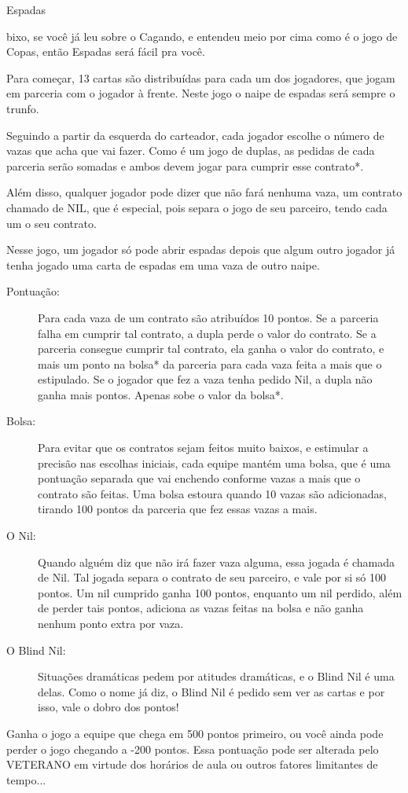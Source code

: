 \begin{subsecao}{Espadas} 

bixo, se você já leu sobre o Cagando, e entendeu meio por cima como é o jogo de
Copas, então Espadas será fácil pra você. 

Para começar, 13 cartas são distribuídas para cada um dos jogadores, que jogam
em parceria com o jogador à frente. Neste jogo o naipe de espadas será sempre o
trunfo.

Seguindo a partir da esquerda do carteador, cada jogador escolhe o número de
vazas que acha que vai fazer. Como é um jogo de duplas, as pedidas de cada
parceria serão somadas e ambos devem jogar para cumprir esse contrato*. 

Além disso, qualquer jogador pode dizer que não fará nenhuma vaza, um contrato
chamado de NIL, que é especial, pois separa o jogo de seu parceiro, tendo cada
um o seu contrato.

Nesse jogo, um jogador só pode abrir espadas depois que algum outro jogador já
tenha jogado uma carta de espadas em uma vaza de outro naipe.
\begin{description}

\item[Pontuação:]

Para cada vaza de um contrato são atribuídos 10 pontos. Se a parceria falha em
cumprir tal contrato, a dupla perde o valor do contrato. Se a parceria consegue
cumprir tal contrato, ela ganha o valor do contrato, e mais um ponto
na bolsa* da parceria para cada vaza feita a mais que o estipulado.
Se o jogador que fez a vaza tenha pedido Nil, a dupla não ganha mais pontos.
Apenas sobe o valor da bolsa*.

\item[Bolsa:]

Para evitar que os contratos sejam feitos muito baixos, e estimular a precisão
nas escolhas iniciais, cada equipe mantém uma bolsa, que é uma pontuação
separada que vai enchendo conforme vazas a mais que o contrato são feitas. Uma
bolsa estoura quando 10 vazas são adicionadas, tirando 100 pontos da parceria
que fez essas vazas a mais.

\item[O Nil:]
Quando alguém diz que não irá fazer vaza alguma, essa jogada é chamada de Nil.
Tal jogada separa o contrato de seu parceiro, e vale por si só 100 pontos. Um
nil cumprido ganha 100 pontos, enquanto um nil perdido, além de perder tais
pontos, adiciona as vazas feitas na bolsa e não ganha nenhum ponto extra por
vaza.

\item[O Blind Nil:]
Situações dramáticas pedem por atitudes dramáticas, e o Blind Nil é uma delas.
Como o nome já diz, o Blind Nil é pedido sem ver as cartas e por isso, vale o
dobro dos pontos!

\end{description}
Ganha o jogo a equipe que chega em 500 pontos primeiro, ou você ainda pode
perder o jogo chegando a -200 pontos. Essa pontuação pode ser alterada pelo
VETERANO em virtude dos horários de aula ou outros fatores limitantes de
tempo...

\end{subsecao}
